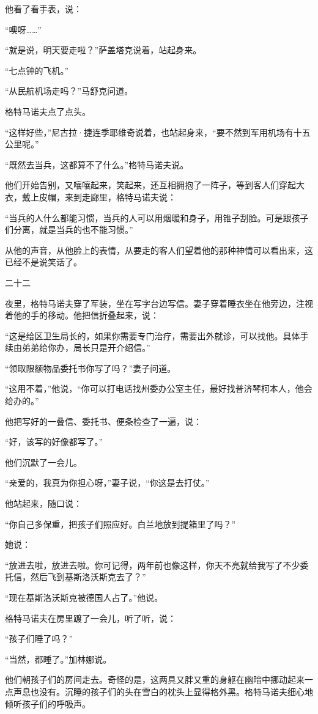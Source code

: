 他看了看手表，说：

“噢呀……”

“就是说，明天要走啦？”萨盖塔克说着，站起身来。

“七点钟的飞机。”

“从民航机场走吗？”马舒克问道。

格特马诺夫点了点头。

“这样好些，”尼古拉·捷连季耶维奇说着，也站起身来，“要不然到军用机场有十五公里呢。”

“既然去当兵，这都算不了什么。”格特马诺夫说。

他们开始告别，又嚷嚷起来，笑起来，还互相拥抱了一阵子，等到客人们穿起大衣，戴上皮帽，来到走廊里，格特马诺夫说：

“当兵的人什么都能习惯，当兵的人可以用烟暖和身子，用锥子刮脸。可是跟孩子们分离，就是当兵的也不能习惯。”

从他的声音，从他脸上的表情，从要走的客人们望着他的那种神情可以看出来，这已经不是说笑话了。

二十二

夜里，格特马诺夫穿了军装，坐在写字台边写信。妻子穿着睡衣坐在他旁边，注视着他的手的移动。他把信折叠起来，说：

“这是给区卫生局长的，如果你需要专门治疗，需要出外就诊，可以找他。具体手续由弟弟给你办，局长只是开介绍信。”

“领取限额物品委托书你写了吗？”妻子问道。

“这用不着，”他说，“你可以打电话找州委办公室主任，最好找普济琴柯本人，他会给办的。”

他把写好的一叠信、委托书、便条检查了一遍，说：

“好，该写的好像都写了。”

他们沉默了一会儿。

“亲爱的，我真为你担心呀，”妻子说，“你这是去打仗。”

他站起来，随口说：

“你自己多保重，把孩子们照应好。白兰地放到提箱里了吗？”

她说：

“放进去啦，放进去啦。你可记得，两年前也像这样，你天不亮就给我写了不少委托信，然后飞到基斯洛沃斯克去了？”

“现在基斯洛沃斯克被德国人占了。”他说。

格特马诺夫在房里踱了一会儿，听了听，说：

“孩子们睡了吗？”

“当然，都睡了。”加林娜说。

他们朝孩子们的房间走去。奇怪的是，这两具又胖又重的身躯在幽暗中挪动起来一点声息也没有。沉睡的孩子们的头在雪白的枕头上显得格外黑。格特马诺夫细心地倾听孩子们的呼吸声。

